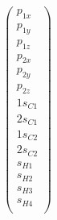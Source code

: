 \documentclass[9pt]{report}
\begin{document}
\begin{equation}
\left(\begin{array}{c} p_{1x}  \\  p_{1y}  \\  p_{1z}  \\  p_{2x}  \\ p_{2y} \\  p_{2z}  \\  1s_{C1}  \\  2s_{C1}  \\  1s_{C2}  \\  2s_{C2}  \\  s_{H1}  \\  s_{H2}  \\  s_{H3}  \\  s_{H4}   \\\end{array}\right)
\end{equation}
\normalsize
\end{document}
